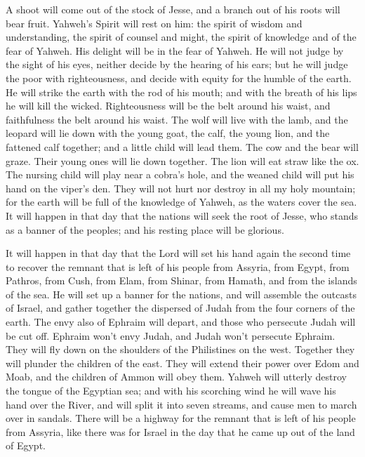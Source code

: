  A shoot will come out of the stock of Jesse, and a branch
out of his roots will bear fruit.  Yahweh's Spirit will rest
on him: the spirit of wisdom and understanding, the spirit of counsel
and might, the spirit of knowledge and of the fear of Yahweh.
 His delight will be in the fear of Yahweh. He will not
judge by the sight of his eyes, neither decide by the hearing of his
ears;  but he will judge the poor with righteousness, and
decide with equity for the humble of the earth. He will strike the earth
with the rod of his mouth; and with the breath of his lips he will kill
the wicked.  Righteousness will be the belt around his
waist, and faithfulness the belt around his waist.  The wolf
will live with the lamb, and the leopard will lie down with the young
goat, the calf, the young lion, and the fattened calf together; and a
little child will lead them.  The cow and the bear will
graze. Their young ones will lie down together. The lion will eat straw
like the ox.  The nursing child will play near a cobra's
hole, and the weaned child will put his hand on the viper's den.
 They will not hurt nor destroy in all my holy mountain; for
the earth will be full of the knowledge of Yahweh, as the waters cover
the sea.  It will happen in that day that the nations will
seek the root of Jesse, who stands as a banner of the peoples; and his
resting place will be glorious.

 It will happen in that day that the Lord will set his hand
again the second time to recover the remnant that is left of his people
from Assyria, from Egypt, from Pathros, from Cush, from Elam, from
Shinar, from Hamath, and from the islands of the sea.  He
will set up a banner for the nations, and will assemble the outcasts of
Israel, and gather together the dispersed of Judah from the four corners
of the earth.  The envy also of Ephraim will depart, and
those who persecute Judah will be cut off. Ephraim won't envy Judah, and
Judah won't persecute Ephraim.  They will fly down on the
shoulders of the Philistines on the west. Together they will plunder the
children of the east. They will extend their power over Edom and Moab,
and the children of Ammon will obey them.  Yahweh will
utterly destroy the tongue of the Egyptian sea; and with his scorching
wind he will wave his hand over the River, and will split it into seven
streams, and cause men to march over in sandals.  There
will be a highway for the remnant that is left of his people from
Assyria, like there was for Israel in the day that he came up out of the
land of Egypt.


